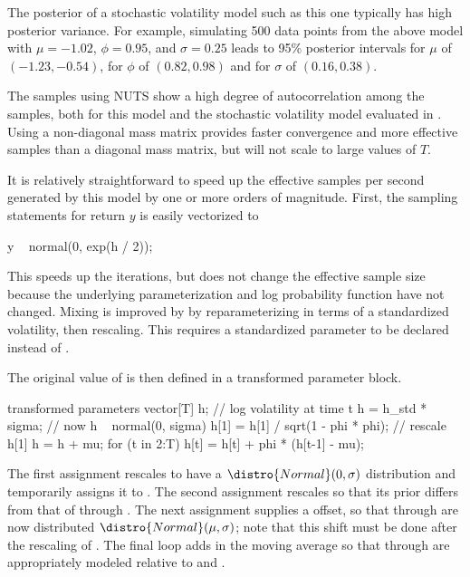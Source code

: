 The posterior of a stochastic volatility model such as this one
typically has high posterior variance.  For example, simulating 500
data points from the above model with $\mu = -1.02$, $\phi = 0.95$,
and $\sigma = 0.25$ leads to 95\% posterior intervals for $\mu$ of
$(-1.23, -0.54)$, for $\phi$ of $(0.82,0.98 )$ and for $\sigma$ of
$(0.16,0.38)$. 

The samples using NUTS show a high degree of autocorrelation among the
samples, both for this model and the stochastic volatility model
evaluated in \citep{Hoffman-Gelman:2011, Hoffman-Gelman:2014}.  
Using a non-diagonal mass
matrix provides faster convergence and more effective samples than a
diagonal mass matrix, but will not scale to large values of $T$.

It is relatively straightforward to speed up the effective samples per
second generated by this model by one or more orders of magnitude.
First, the sampling statements for return $y$ is easily vectorized to
%
\begin{stancode}
y ~ normal(0, exp(h / 2));
\end{stancode}
%
This speeds up the iterations, but does not change the effective
sample size because the underlying parameterization and log
probability function have not changed.  Mixing is improved by by
reparameterizing in terms of a standardized volatility, then
rescaling.  This requires a standardized parameter  to be
declared instead of .
\begin{stancode}
parameters {
  ...
  vector[T] h_std;             // std log volatility time t
\end{stancode}
%
The original value of  is then defined in a transformed
parameter block.
%
\begin{stancode}
transformed parameters {
  vector[T] h;            // log volatility at time t
  h = h_std * sigma;     // now h ~ normal(0, sigma)
  h[1] = h[1] / sqrt(1 - phi * phi);  // rescale h[1]
  h = h + mu;
  for (t in 2:T)
    h[t] = h[t] + phi * (h[t-1] - mu);
}
\end{stancode}
%
The first assignment rescales  to have a
$\distro{Normal}(0,\sigma)$ distribution and temporarily assigns it to
.  The second assignment rescales  so that its
prior differs from that of  through .  The next
assignment supplies a  offset, so that  through
 are now distributed $\distro{Normal}(\mu,\sigma)$; note
that this shift must be done after the rescaling of .  The
final loop adds in the moving average so that  through
 are appropriately modeled relative to  and
.

